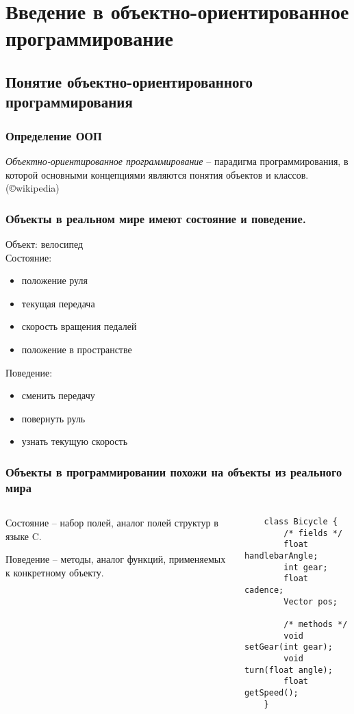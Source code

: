 \section{Введение в объектно-ориентированное программирование}

\subsection{Понятие объектно-ориентированного программирования}

\begin{frame}
	\frametitle{Определение ООП}

	\begin{large}
	\emph{Объектно-ориентированное программирование} -- парадигма программирования, в которой основными концепциями являются понятия объектов и классов. (©wikipedia)
	\end{large}
\end{frame}

\begin{frame}
	\frametitle{Объекты в реальном мире имеют состояние и поведение.}

	Объект: велосипед\\
	Состояние:
	\begin{itemize}
		\item{положение руля}
		\item{текущая передача}
		\item{скорость вращения педалей}
		\item{положение в пространстве}
	\end{itemize}
	Поведение:
	\begin{itemize}
		\item{сменить передачу}
		\item{повернуть руль}
		\item{узнать текущую скорость}
	\end{itemize}
\end{frame}

\begin{frame}[fragile]
	\frametitle{Объекты в программировании похожи на объекты из реального мира}

	\begin{columns}[c]
	\column{2.1in}
	\begin{large}
	Состояние -- набор полей, аналог полей структур в языке C.

	\medskip
	Поведение -- методы, аналог функций, применяемых к конкретному объекту.
	\end{large}
	\column{2.3in}
	\begin{verbatim}
	class Bicycle {
	    /* fields */
	    float handlebarAngle;
	    int gear;
	    float cadence;
	    Vector pos;

	    /* methods */
	    void setGear(int gear);
	    void turn(float angle);
	    float getSpeed();
	}
	\end{verbatim}
	\end{columns}
\end{frame}

